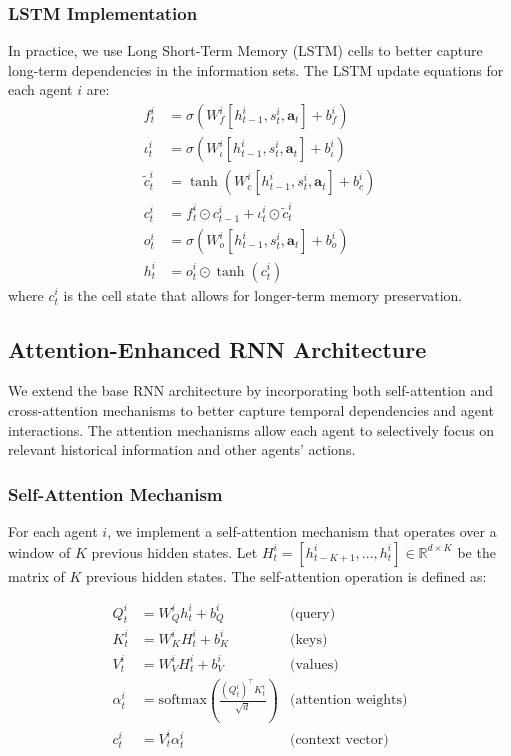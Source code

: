 \subsubsection*{LSTM Implementation}

In practice, we use Long Short-Term Memory (LSTM) cells to better capture long-term dependencies in the information sets. The LSTM update equations for each agent $i$ are:
\begin{align}
    f^i_t &= \sigma(W^i_f [h^i_{t-1}, s^i_t, \mathbf{a}_t] + b^i_f) \\
    \iota^i_t &= \sigma(W^i_\iota [h^i_{t-1}, s^i_t, \mathbf{a}_t] + b^i_\iota) \\
    \tilde{c}^i_t &= \tanh(W^i_c [h^i_{t-1}, s^i_t, \mathbf{a}_t] + b^i_c) \\
    c^i_t &= f^i_t \odot c^i_{t-1} + \iota^i_t \odot \tilde{c}^i_t \\
    o^i_t &= \sigma(W^i_o [h^i_{t-1}, s^i_t, \mathbf{a}_t] + b^i_o) \\
    h^i_t &= o^i_t \odot \tanh(c^i_t)
\end{align}
where $c^i_t$ is the cell state that allows for longer-term memory preservation.

\subsection*{Attention-Enhanced RNN Architecture}

We extend the base RNN architecture by incorporating both self-attention and cross-attention mechanisms to better capture temporal dependencies and agent interactions. The attention mechanisms allow each agent to selectively focus on relevant historical information and other agents' actions.

\subsubsection*{Self-Attention Mechanism}
For each agent $i$, we implement a self-attention mechanism that operates over a window of $K$ previous hidden states. Let $H_t^i = [h_{t-K+1}^i, ..., h_t^i] \in \mathbb{R}^{d \times K}$ be the matrix of $K$ previous hidden states. The self-attention operation is defined as:

\begin{align*}
Q_t^i &= W_Q^i h_t^i + b_Q^i & \text{(query)} \\
K_t^i &= W_K^i H_t^i + b_K^i & \text{(keys)} \\
V_t^i &= W_V^i H_t^i + b_V^i & \text{(values)} \\
\alpha_t^i &= \text{softmax}\left(\frac{(Q_t^i)^\top K_t^i}{\sqrt{d}}\right) & \text{(attention weights)} \\
c_t^i &= V_t^i \alpha_t^i & \text{(context vector)}
\end{align*}

